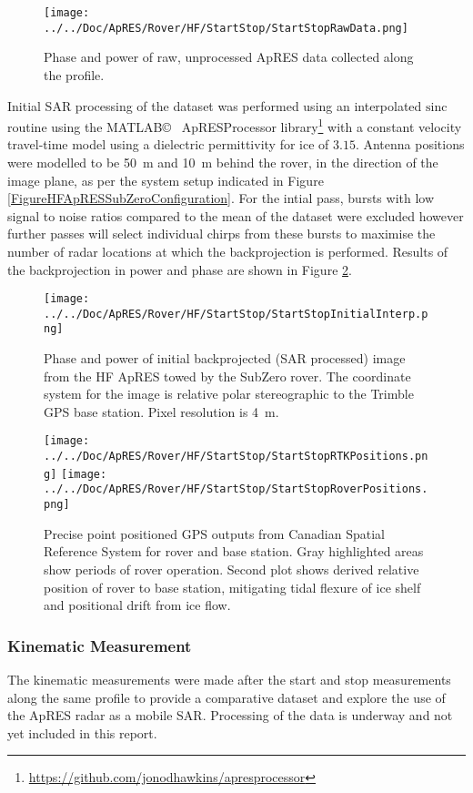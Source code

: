 \documentclass[a4paper,12pt]{article}
\begin{document}
\begin{figure}[h!]
  \centering 
  \texttt{[image: ../../Doc/ApRES/Rover/HF/StartStop/StartStopRawData.png]}
  \caption{Phase and power of raw, unprocessed ApRES data collected along the
  profile.}
  \label{FigureHFApRESRaw}
\end{figure}

Initial SAR processing of the dataset was performed using an interpolated 
$\textrm{sinc}$ routine using the MATLAB\copyright~ ApRESProcessor library\footnote{
\url{https://github.com/jonodhawkins/apresprocessor}} with a constant velocity
travel-time model using a dielectric permittivity for ice of $3.15$.  Antenna
positions were modelled to be \SI{50}{\metre} and \SI{10}{\metre} behind the
rover, in the direction of the image plane, as per the system setup indicated in
Figure \ref{FigureHFApRESSubZeroConfiguration}. For the
intial pass, bursts with low signal to noise ratios compared to the mean of the
dataset were excluded however further passes will select individual chirps from
these bursts to maximise the number of radar locations at which the
backprojection is performed.  Results of the backprojection in power and phase
are shown in Figure \ref{FigureHFApRESBackprojection}.

\begin{figure}[h]
  \centering 
  \texttt{[image: ../../Doc/ApRES/Rover/HF/StartStop/StartStopInitialInterp.png]}
  \caption{Phase and power of initial backprojected (SAR processed) image from
  the HF ApRES towed by the SubZero rover.  The coordinate system for the image
  is relative polar stereographic to the Trimble GPS base station.  Pixel
  resolution is \SI{4}{\metre}.}
  \label{FigureHFApRESBackprojection}
\end{figure}

\begin{figure}[h!]
  \centering 
  \texttt{[image: ../../Doc/ApRES/Rover/HF/StartStop/StartStopRTKPositions.png]}
  \texttt{[image: ../../Doc/ApRES/Rover/HF/StartStop/StartStopRoverPositions.png]}
  \caption{Precise point positioned GPS outputs from Canadian Spatial Reference
  System for rover and base station.  Gray highlighted areas show periods of rover
  operation.  Second plot shows derived relative position of rover to base 
  station, mitigating tidal flexure of ice shelf and positional drift from ice 
  flow.}
  \label{FigureHFApRESGNSS}
\end{figure}

\subsubsection{Kinematic Measurement}
The kinematic measurements were made after the start and stop measurements along
the same profile to provide a comparative dataset and explore the use of the
ApRES radar as a mobile SAR.  Processing of the data is underway and not yet
included in this report.
\end{document}

